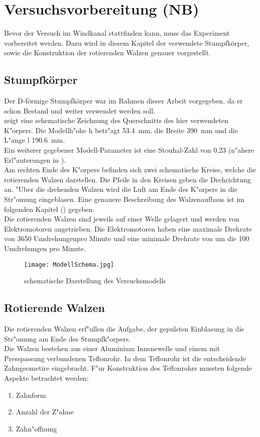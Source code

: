 \chapter{Versuchsvorbereitung (NB)}
\label{s:versuchsvorbereitung}
Bevor der Versuch im Windkanal stattfinden kann, muss das Experiment vorbereitet werden. Dazu wird in diesem Kapitel der verwendete Stumpfk\"orper, sowie die Konstruktion der rotierenden Walzen genauer vorgestellt.
\section{Stumpfk\"orper}
Der D-f\"ormige Stumpfk\"orper war im Rahmen dieser Arbeit vorgegeben, da er schon Bestand und weiter verwendet werden soll.\\
 zeigt eine schematische Zeichnung des Querschnitts des hier verwendeten K"orpers. Die Modellh"ohe h betr"agt \SI{53,4}{\milli\meter}, die Breite \SI{390}{\milli\meter} und die L"ange l \SI{190,6}{\milli\meter}.\\
Ein weiterer gegebener Modell-Parameter ist eine Stouhal-Zahl von 0,23 (n"ahere Erl"auterungen in ).\\
Am rechten Ende des K"orpers befinden sich zwei schematische Kreise, welche die rotierenden Walzen darstellen. Die Pfeile in den Kreisen geben die Drehrichtung an. "Uber die drehenden Walzen wird die Luft am Ende des K"orpers in die Str"omung eingeblasen. Eine genauere Beschreibung des Walzenaufbaus ist im folgenden Kapitel () gegeben.\\
Die rotierenden Walzen sind jeweils auf einer Welle gelagert und werden von Elektromotoren angetrieben. Die Elektromotoren haben eine maximale Drehrate von 3650 Umdrehungenpro Minute und eine minimale Drehrate von um die 100 Umdrehungen pro Minute.
\begin{figure}[h]
	\centering
	\texttt{[image: ModellSchema.jpg]}
	\caption{schematische Darstellung des Versuchsmodells}
	\label{fig:modelschema}
\end{figure}

\section{Rotierende Walzen}
\label{rotierendeWalze}
Die rotierenden Walzen erf"ullen die Aufgabe, der gepulsten Einblasung in die Str"omung am Ende des Stumpfk"orpers.\\
Die Walzen bestehen aus einer Aluminium Innenewelle und einem mit Presspassung verbundenen Teflonrohr. In dem Teflonrohr ist die entscheidende Zahngeometire eingebracht. F"ur Konstruktion des Teflonrohrs mussten folgende Aspekte betrachtet werden:
\begin{enumerate}
	\item Zahnform 
	\item Anzahl der Z"ahne
	\item Zahn"offnung 
\end{enumerate}

